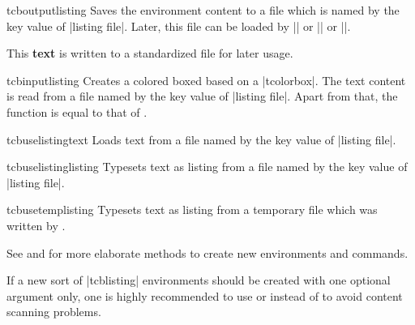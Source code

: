 \clearpage
\begin{docEnvironment}{tcboutputlisting}{}
  Saves the environment content to a file which is named by the key value of
  |listing file|. Later, this file can be loaded by
  |\tcbinputlisting| or |\tcbuselistingtext| or |\tcbuselistinglisting|.
\begin{dispListing}
\begin{tcboutputlisting}
This \textbf{text} is written to a standardized file for later usage.
\end{tcboutputlisting}
\end{dispListing}
\end{docEnvironment}


\begin{docCommand}{tcbinputlisting}{}
  Creates a colored boxed based on a |tcolorbox|. The text content is read
  from a file named by the key value of |listing file|. Apart from that,
  the function is equal to that of .
\begin{dispExample}
\end{dispExample}
\end{docCommand}

\begin{docCommand}{tcbuselistingtext}{}
  Loads text from a file named by the key value of |listing file|.
\begin{dispExample}
\tcbuselistingtext
\end{dispExample}
\end{docCommand}


\begin{docCommand}{tcbuselistinglisting}{}
  Typesets text as listing from a file named by the key value of |listing file|.
\begin{dispExample}
\tcbuselistinglisting
\end{dispExample}
\end{docCommand}

\begin{docCommand}{tcbusetemplisting}{}
  Typesets text as listing from a temporary file which was written by
  .
\end{docCommand}


\clearpage
\begin{marker}
See  and  for more
elaborate methods to create new environments and commands.
\end{marker}
\begin{marker}
If a new sort of |tcblisting| environments should be created with
one optional argument only, one is highly recommended to use
 or 
instead of  to
avoid content scanning problems.
\end{marker}

